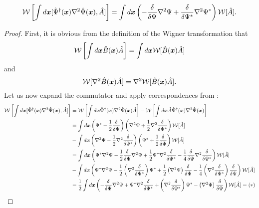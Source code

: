 \begin{theorem}
\label{thm:formalism:transformations:w-laplacian-commutator1}
\[
	\mathcal{W} \left[
		\int d\boldsymbol{x} [\hat{\Psi}^\dagger(\boldsymbol{x}) \nabla^2 \hat{\Psi}(\boldsymbol{x}), \hat{A}]
	\right]
	= \int d\boldsymbol{x} \left(
		- \frac{\delta}{\delta \Psi} \nabla^2 \Psi
		+ \frac{\delta}{\delta \Psi^*} \nabla^2 \Psi^*
	\right) \mathcal{W}[\hat{A}].
\]
\end{theorem}
\begin{proof}
First, it is obvious from the definition of the Wigner transformation that
\[
	\mathcal{W} \left[ \int d\boldsymbol{x} \hat{B}(\boldsymbol{x}) \hat{A} \right]
	= \int d\boldsymbol{x} \mathcal{W} [\hat{B}(\boldsymbol{x}) \hat{A}]
\]
and
\[
	\mathcal{W} [ \nabla^2 \hat{B}(\boldsymbol{x}) \hat{A} ]
	= \nabla^2 \mathcal{W} [\hat{B}(\boldsymbol{x}) \hat{A}].
\]
Let us now expand the commutator and apply correspondences from :
\begin{equation*}
\begin{split}
	\mathcal{W} \left[
		\int d\boldsymbol{x} [\hat{\Psi}^\dagger(\boldsymbol{x}) \nabla^2 \hat{\Psi}(\boldsymbol{x}), \hat{A}]
	\right]
	& = \mathcal{W} \left[
			\int d\boldsymbol{x} \hat{\Psi}^\dagger(\boldsymbol{x}) \nabla^2 \hat{\Psi}(\boldsymbol{x}) \hat{A}
		\right]
		- \mathcal{W} \left[
				\int d\boldsymbol{x} \hat{A} \hat{\Psi}^\dagger(\boldsymbol{x}) \nabla^2 \hat{\Psi}(\boldsymbol{x})
		\right] \\
	& = \int d\boldsymbol{x} \left(
			\Psi^* - \frac{1}{2} \frac{\delta}{\delta \Psi}
		\right)
		\left(
			\nabla^2 \Psi + \frac{1}{2} \nabla^2 \frac{\delta}{\delta \Psi^*}
		\right)
		\mathcal{W}[\hat{A}] \\
	& - \int d\boldsymbol{x} \left(
			\nabla^2 \Psi - \frac{1}{2} \nabla^2 \frac{\delta}{\delta \Psi^*}
		\right)
		\left(
			\Psi^* + \frac{1}{2} \frac{\delta}{\delta \Psi}
		\right)
		\mathcal{W}[\hat{A}] \\
	& = \int d\boldsymbol{x} \left(
			\Psi^* \nabla^2 \Psi
			- \frac{1}{2} \frac{\delta}{\delta \Psi} \nabla^2 \Psi
			+ \frac{1}{2} \Psi^* \nabla^2 \frac{\delta}{\delta \Psi^*}
			- \frac{1}{4} \frac{\delta}{\delta \Psi} \nabla^2 \frac{\delta}{\delta \Psi^*}
		\right)
		\mathcal{W}[\hat{A}] \\
	& - \int d\boldsymbol{x} \left(
			\Psi^* \nabla^2 \Psi
			- \frac{1}{2} \left( \nabla^2 \frac{\delta}{\delta \Psi^*} \right) \Psi^*
			+ \frac{1}{2} \left( \nabla^2 \Psi \right) \frac{\delta}{\delta \Psi}
			- \frac{1}{4} \left(
				\nabla^2 \frac{\delta}{\delta \Psi^*}
			\right) \frac{\delta}{\delta \Psi}
		\right)
		\mathcal{W}[\hat{A}] \\
	& = \frac{1}{2} \int d\boldsymbol{x} \left(
			- \frac{\delta}{\delta \Psi} \nabla^2 \Psi
			+ \Psi^* \nabla^2 \frac{\delta}{\delta \Psi^*}
			+ \left( \nabla^2 \frac{\delta}{\delta \Psi^*} \right) \Psi^*
			- \left( \nabla^2 \Psi \right) \frac{\delta}{\delta \Psi}
		\right)
		\mathcal{W}[\hat{A}]
	= (*)
\end{split}
\end{equation*}


\end{proof}
